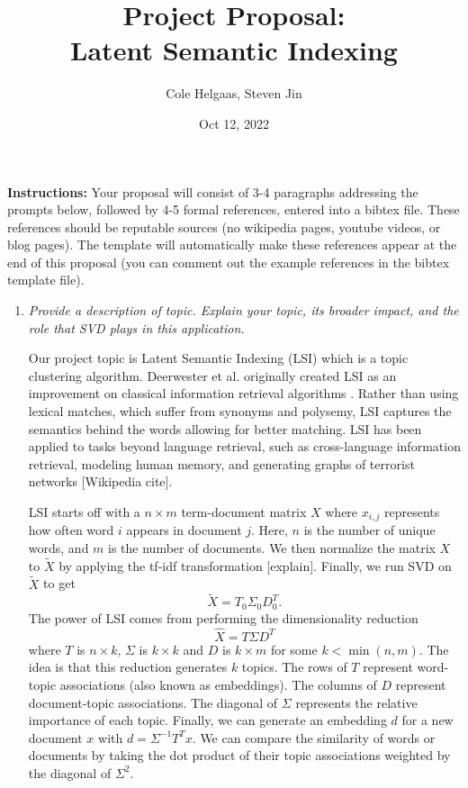 \documentclass[11pt]{article}
\title{Project Proposal: \\ Latent Semantic Indexing}
\author{Cole Helgaas, Steven Jin}
\date{Oct 12, 2022}
\begin{document}
\maketitle
\textbf{Instructions:} Your proposal will consist of 3-4 paragraphs addressing the prompts below, followed by 4-5 formal references, entered into a bibtex file.
These references should be reputable sources (no wikipedia pages, youtube videos, or blog pages).
The template will automatically make these references appear at the end of this proposal (you can comment out the example references in the bibtex template file).
\begin{enumerate}
	\item \emph{Provide a description of topic.
      Explain your topic, its broader impact, and the role that SVD plays in this application.
    }

    Our project topic is Latent Semantic Indexing (LSI) which is a topic clustering algorithm.
    Deerwester et al. originally created LSI as an improvement on classical information retrieval algorithms \cite{seminal}.
    Rather than using lexical matches, which suffer from synonyms and polysemy, LSI captures the semantics behind the words allowing for better matching.
    LSI has been applied to tasks beyond language retrieval, such as cross-language information retrieval, modeling human memory, and generating graphs of terrorist networks [Wikipedia cite].

    LSI starts off with a $n \times m$ term-document matrix $X$ where $x_{i,j}$ represents how often word $i$ appears in document $j$.
    Here, $n$ is the number of unique words, and $m$ is the number of documents.
    We then normalize the matrix $X$ to $\tilde{X}$ by applying the tf-idf transformation [explain].
    Finally, we run SVD on $\tilde{X}$ to get
    \[
      \tilde{X} = T_0 \Sigma_0 D_0^{T}.
    \]
    The power of LSI comes from performing the dimensionality reduction
    \[
      \hat{X} = T \Sigma D^{T}
    \]
    where $T$ is $n \times k$, $\Sigma$ is $k \times k$ and $D$ is $k \times m$ for some $k < \min(n, m)$.
    The idea is that this reduction generates $k$ topics.
    The rows of $T$ represent word-topic associations (also known as embeddings).
    The columns of $D$ represent document-topic associations.
    The diagonal of $\Sigma$ represents the relative importance of each topic.
    Finally, we can generate an embedding $d$ for a new document $x$ with
    $d = \Sigma^{-1} T^{T} x$.
    We can compare the similarity of words or documents by taking the dot product of their topic associations weighted by the diagonal of $\Sigma^2$.


\end{enumerate}
\end{document}
